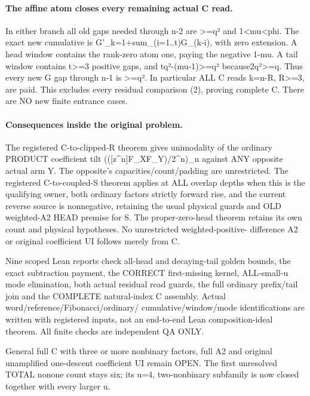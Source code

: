 \paragraph{The affine atom closes every remaining actual C read.}
In either branch all old gaps needed through n-2 are >=q² and
1<mu<phi. The exact new cumulative is
G'_k=1+sum_(i=1..t)G_(k-i), with zero extension.
A head window contains the rank-zero atom one, paying the negative
1-mu. A tail window contains t>=3 positive gaps, and
tq²-(mu-1)>=q² because2q²>=q. Thus every new G gap through
n-1 is >=q². In particular ALL C reads k=n-R, R>=3, are paid.
This excludes every residual comparison (2), proving complete C.
There are NO new finite entrance cases.

\paragraph{Consequences inside the original problem.}
The registered C-to-clipped-R theorem gives unimodality of the
ordinary PRODUCT coefficient tilt (([z^n]F_XF_Y)/2^n)_n against
ANY opposite actual arm Y. The opposite's capacities/count/padding
are unrestricted. The registered C-to-coupled-S theorem applies at
ALL overlap depths when this is the qualifying owner, both ordinary
factors strictly forward rise, and the current reverse source is
nonnegative, retaining the usual physical guards and OLD weighted-A2
HEAD premise for S. The proper-zero-head theorem retains its own
count and physical hypotheses. No unrestricted weighted-positive-
difference A2 or original coefficient UI follows merely from C.

Nine scoped Lean reports check all-head and decaying-tail golden
bounds, the exact subtraction payment, the CORRECT first-missing
kernel, ALL-small-u mode elimination, both actual residual read
guards, the full ordinary prefix/tail join and the COMPLETE
natural-index C assembly. Actual word/reference/Fibonacci/ordinary/
cumulative/window/mode identifications are written with registered
inputs, not an end-to-end Lean composition-ideal theorem.
All finite checks are independent QA ONLY.

General full C with three or more nonbinary factors, full A2 and
original unamplified one-descent coefficient UI remain OPEN.
The first unresolved TOTAL nonone count stays six; its u=4,
two-nonbinary subfamily is now closed together with every larger u.

